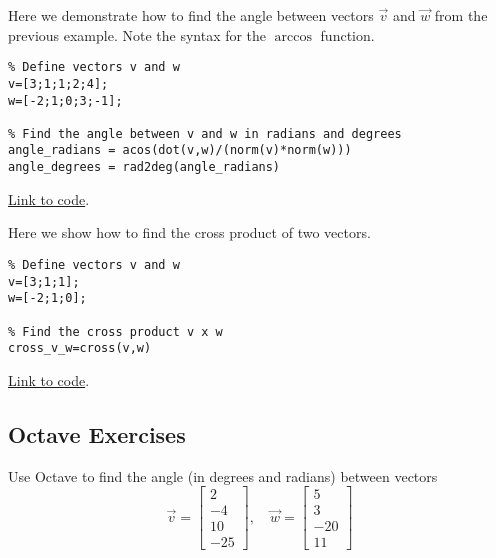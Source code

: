 \documentclass{ximera}
\begin{document}
\begin{example}\label{ex:angleInOctave}
    Here we demonstrate how to find the angle between vectors $\vec{v}$ and $\vec{w}$ from the previous example.  Note the syntax for the $\arccos{}$ function.
    \begin{explanation}
        \begin{verbatim}
% Define vectors v and w
v=[3;1;1;2;4];
w=[-2;1;0;3;-1];

% Find the angle between v and w in radians and degrees
angle_radians = acos(dot(v,w)/(norm(v)*norm(w)))
angle_degrees = rad2deg(angle_radians)
        \end{verbatim}

\href{https://sagecell.sagemath.org/?z=eJxVjM8KAiEQxu-C7zCXBY2WWreb7C16iSXC1mkTSkFFX79pyUPMYfj-_L4OzvhwHqHgkkNMUMB4C5WzMs2jHuiUPl01Z3Wae0XyqEfdD1-Hsw4ujtr5iUStL4Q75oro2wo4D9FYZ3zaDItrREycbe1biyYwS0jChizKvsqD8CG-RZG77VcpZSN-A0QQq0iJvyX5AVWtQWc=&lang=octave&interacts=eJyLjgUAARUAuQ==}{Link to code}.        
    \end{explanation}
\end{example}

\begin{template}\label{temp:cross}
Here we show how to find the cross product of two vectors.
\begin{verbatim}
% Define vectors v and w
v=[3;1;1];
w=[-2;1;0];

% Find the cross product v x w
cross_v_w=cross(v,w)
\end{verbatim}

\href{https://sagecell.sagemath.org/?z=eJxTVXBJTcvMS1UoS00uyS8qVihTSMxLUSjn5SqzjTa2NrQ2jLXm5Sq3jdY1AnIMQBxeLlUFt0ygopKMVIXkovziYoWCovyU0uQSoOYKkFawYHxZfLktmKVRplOuCQBmGSA1&lang=octave&interacts=eJyLjgUAARUAuQ==}{Link to code}.
\end{template}

\subsection*{Octave Exercises}

\begin{problem}\label{prob_oct_vec_2}
    Use Octave to find the angle (in degrees and radians) between vectors 
    $$\vec{v}=\begin{bmatrix}2\\-4\\10\\-25\end{bmatrix},\quad\vec{w}=\begin{bmatrix}5\\3\\-20\\11\end{bmatrix}$$
\end{problem}
\end{document}

